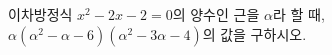 이차방정식 $x^2-2x-2=0$의 양수인 근을 $\alpha$라 할 때, $\alpha(\alpha^2-\alpha-6)(\alpha^2-3\alpha-4)$의 값을 구하시오.
